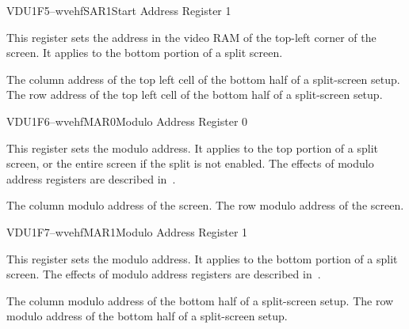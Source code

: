 \begin{ioport}{VDU}{1F5}{--wvehf}{SAR1}{Start Address Register 1}

  This register sets the address in the video RAM of the top-left corner of the
  screen. It applies to the bottom portion of a split screen.

  \begin{bitfield}
  \end{bitfield}

  \begin{description}
   The column address of the top left cell of the bottom half of a split-screen setup.
   The row address of the top left cell of the bottom half of a split-screen setup.
  \end{description}

\end{ioport}




\begin{ioport}{VDU}{1F6}{--wvehf}{MAR0}{Modulo Address Register 0}

  This register sets the modulo address. It applies to the top portion of a
  split screen, or the entire screen if the split is not enabled. The effects
  of modulo address registers are described in~.

  \begin{bitfield}
  \end{bitfield}

  \begin{description}
   The column modulo address of the screen.
   The row modulo address of the screen.
  \end{description}

\end{ioport}






\begin{ioport}{VDU}{1F7}{--wvehf}{MAR1}{Modulo Address Register 1}

  This register sets the modulo address. It applies to the bottom portion of a
  split screen. The effects of modulo address registers are described
  in~.

  \begin{bitfield}
  \end{bitfield}

  \begin{description}
   The column modulo address of the bottom half of a split-screen setup.
   The row modulo address of the bottom half of a split-screen setup.
  \end{description}

\end{ioport}




